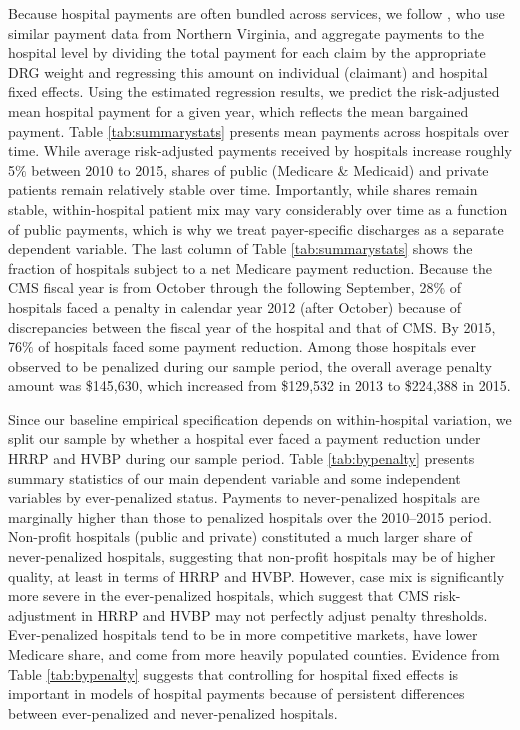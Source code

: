 \documentclass[12pt]{article}
\begin{document}
Because hospital payments are often bundled across services, we follow \citet{gowrisankaran2015}, who use similar payment data from Northern Virginia, and aggregate payments to the hospital level by dividing the total payment for each claim by the appropriate DRG weight and regressing this amount on individual (claimant) and hospital fixed effects.  Using the estimated regression results, we predict the risk-adjusted mean hospital payment for a given year, which reflects the mean bargained payment. Table \ref{tab:summarystats} presents mean payments across hospitals over time. While average risk-adjusted payments received by hospitals increase roughly 5$\%$ between 2010 to 2015, shares of public (Medicare \& Medicaid) and private patients remain relatively stable over time.  Importantly, while shares remain stable, within-hospital patient mix may vary considerably over time as a function of public payments, which is why we treat payer-specific discharges as a separate dependent variable.  The last column of Table \ref{tab:summarystats} shows the fraction of hospitals subject to a net Medicare payment reduction.  Because the CMS fiscal year is from October through the following September, 28$\%$ of hospitals faced a penalty in calendar year 2012 (after October) because of discrepancies between the fiscal year of the hospital and that of CMS.  By 2015, 76$\%$ of hospitals faced some payment reduction. Among those hospitals ever observed to be penalized during our sample period, the overall average penalty amount was \$145,630, which increased from \$129,532 in 2013 to \$224,388 in 2015.


Since our baseline empirical specification depends on within-hospital variation, we split our sample by whether a hospital ever faced a payment reduction under HRRP and HVBP during our sample period.  Table \ref{tab:bypenalty} presents summary statistics of our main dependent variable and some independent variables by ever-penalized status.  Payments to never-penalized hospitals are marginally higher than those to penalized hospitals over the 2010--2015 period.  Non-profit hospitals (public and private) constituted a much larger share of never-penalized hospitals, suggesting that non-profit hospitals may be of higher quality, at least in terms of HRRP and HVBP.  However, case mix is significantly more severe in the ever-penalized hospitals, which suggest that CMS risk-adjustment in HRRP and HVBP may not perfectly adjust penalty thresholds.  Ever-penalized hospitals tend to be in more competitive markets, have lower Medicare share, and come from more heavily populated counties.  Evidence from Table \ref{tab:bypenalty} suggests that controlling for hospital fixed effects is important in models of hospital payments because of persistent differences between ever-penalized and never-penalized hospitals.
\end{document}
